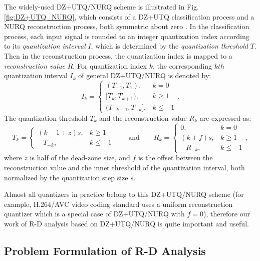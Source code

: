 \documentclass[smallabstract,smallcaptions]{dccpaper}
\begin{document}
The widely-used DZ+UTQ/NURQ scheme is illustrated in Fig. \ref{fig:DZ+UTQ_NURQ}, which consists of a DZ+UTQ classification process and a NURQ reconstruction process, both symmetric about zero \cite{Sullivan_VCIP2005}. In the classification process, each input signal is rounded to an integer quantization index according to its \emph{quantization interval} $I$, which is determined by the \emph{quantization threshold} $T$. Then in the reconstruction process, the quantization index is mapped to a \emph{reconstruction value} $R$. For quantization index $k$, the corresponding $kth$ quantization interval $I_{k}$ of general DZ+UTQ/NURQ is denoted by:
{\small
\begin{equation}
\label{equ:interval}
I_{k}=\left\{ \begin{array}{ll}
(T_{-1}, T_{1}),         & k = 0 \\
{[T_{k}, T_{k+1})},        & k \ge 1 \\
(T_{-k-1}, T_{-k}],      & k \le -1
\end{array}\right. .
\end{equation}}
The quantization threshold $T_{k}$ and the reconstruction value $R_{k}$ are expressed as:
\begin{equation}
\label{equ:DZ+UTQ/NURQ}
T_{k}=\left\{ \begin{array}{ll}
(k-1+z)s, & k \ge 1 \\
-T_{-k},  & k \le -1
\end{array}\right.
\qquad \textrm{and} \qquad
R_{k}=\left\{ \begin{array}{ll}
0,        & k = 0 \\
(k+f)s,   & k \ge 1 \\
-R_{-k},  & k \le -1
\end{array}\right. ,
\end{equation}
where $z$ is half of the dead-zone size, and $f$ is the offset between the reconstruction value and the inner threshold of the quantization interval, both normalized by the quantization step size $s$.

Almost all quantizers in practice belong to this DZ+UTQ/NURQ scheme (for example, H.264/AVC video coding standard uses a uniform reconstruction quantizer which is a special case of DZ+UTQ/NURQ with $f=0$), therefore our work of R-D analysis based on DZ+UTQ/NURQ is quite important and useful.

\subsection{Problem Formulation of R-D Analysis}
\end{document}
